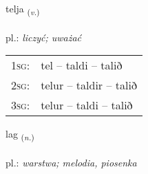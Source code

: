 \documentclass[frontgrid, backgrid]{flacards}\usepackage[]{graphicx}\usepackage[]{xcolor}
\begin{document}
{telja \small{\textsubscript{(\textit{v.})}} \\[1ex] %
\textphonetic{[tʰɛlja]} \\
pl.: \emph{liczyć; uważać} \\  [2ex]
\renewcommand*{\arraystretch}{0.8}
\begin{tabular}{p{1cm}l}
\textsc{1sg}: & tel -- taldi -- talið \\ 
\textsc{2sg}: & telur -- taldir -- talið \\ 
\textsc{3sg}: & telur -- taldi -- talið \\ 
\end{tabular}
}

\renewcommand{\flhead}{\vskip5pt \fboxsep=0pt {\small\bfseries\footnotesize Nafnorð | Noun}}
\renewcommand{\fcfoot}{\vskip5pt \fboxsep=0pt \hspace{2pt}{\small\bfseries\footnotesize 1K}}

\renewcommand{\blhead}{\vskip5pt {\small\bfseries\footnotesize Nafnorð | Noun }}
\renewcommand{\bcfoot}{\vskip5pt \hspace{2pt}{\small\bfseries\footnotesize 1K}}


{lag \small{\textsubscript{(\textit{n.})}} \\[1ex] %
\textphonetic{[laːɣ]} \\
pl.: \emph{warstwa; melodia, piosenka} \\  [2ex]
\renewcommand*{\arraystretch}{0.8}
}


\renewcommand{\flhead}{\vskip5pt \fboxsep=0pt {\small\bfseries\footnotesize Atviksorð | Adverb}}
\renewcommand{\fcfoot}{\vskip5pt \fboxsep=0pt \hspace{2pt}{\small\bfseries\footnotesize 1K}}
\end{document}
